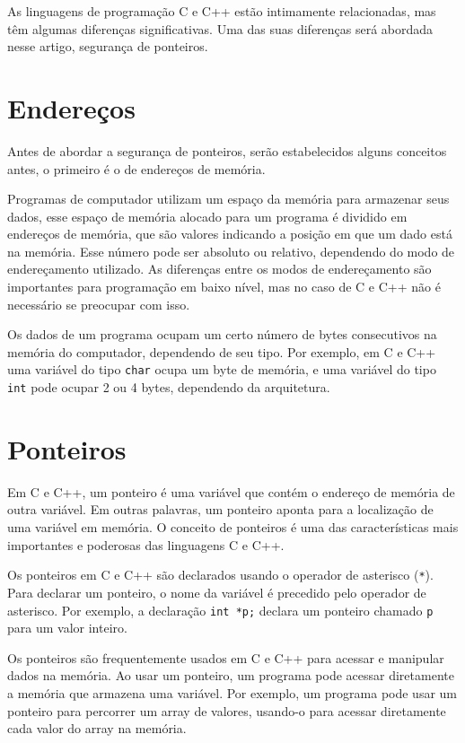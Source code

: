 \documentclass[12pt]{article}
\begin{document}
As linguagens de programação C e C++ estão intimamente relacionadas, mas têm algumas diferenças significativas. Uma das suas diferenças será abordada nesse artigo, segurança de ponteiros.

\section{Endereços} \label{sec:endereco}
Antes de abordar a segurança de ponteiros, serão estabelecidos alguns conceitos antes, o primeiro é o de endereços de memória.

Programas de computador utilizam um espaço da memória para armazenar seus dados, esse espaço de memória alocado para um programa é dividido em endereços de memória, que são valores indicando a posição em que um dado está na memória. Esse número pode ser absoluto ou relativo, dependendo do modo de endereçamento utilizado. As diferenças entre os modos de endereçamento são importantes para programação em baixo nível, mas no caso de C e C++ não é necessário se preocupar com isso.

Os dados de um programa ocupam um certo número de bytes consecutivos na memória do computador, dependendo de seu tipo. Por exemplo, em C e C++ uma variável do tipo \texttt{char} ocupa um byte de memória, e uma variável do tipo \texttt{int} pode ocupar 2 ou 4 bytes, dependendo da arquitetura.

\section{Ponteiros}

Em C e C++, um ponteiro é uma variável que contém o endereço de memória de outra variável. Em outras palavras, um ponteiro aponta para a localização de uma variável em memória. O conceito de ponteiros é uma das características mais importantes e poderosas das linguagens C e C++.

Os ponteiros em C e C++ são declarados usando o operador de asterisco (\texttt{*}). Para declarar um ponteiro, o nome da variável é precedido pelo operador de asterisco. Por exemplo, a declaração \texttt{int *p;} declara um ponteiro chamado \texttt{p} para um valor inteiro.

Os ponteiros são frequentemente usados em C e C++ para acessar e manipular dados na memória. Ao usar um ponteiro, um programa pode acessar diretamente a memória que armazena uma variável. Por exemplo, um programa pode usar um ponteiro para percorrer um array de valores, usando-o para acessar diretamente cada valor do array na memória.
\end{document}
